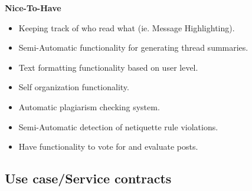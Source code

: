 \documentclass[a4paper,12pt]{report}
\begin{document}
\textbf{Nice-To-Have} 
\begin{itemize}
  \item Keeping track of who read what (ie. Message Highlighting).
  \item Semi-Automatic functionality for generating thread summaries.
  \item Text formatting functionality based on user level.
  \item Self organization functionality.
  \item Automatic plagiarism checking system.
  \item Semi-Automatic detection of netiquette rule violations.
  \item Have functionality to vote for and evaluate posts.
\end{itemize}
\subsection{Use case/Service contracts}
\end{document}
